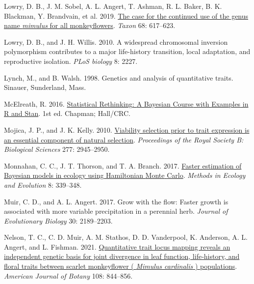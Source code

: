 \documentclass[
  12pt,
]{article}
\newlength{\cslhangindent}
\newlength{\cslentryspacingunit} %
\newenvironment{CSLReferences}[2] %
 {%
  \setlength{\parindent}{0pt}
  \ifodd #1
  \let\oldpar\par
  \def\par{\hangindent=\cslhangindent\oldpar}
  \fi
  \setlength{\parskip}{#2\cslentryspacingunit}
 }%
 {}
\begin{document}
\begin{CSLReferences}{1}{0}
\leavevmode{}%
Lowry, D. B., J. M. Sobel, A. L. Angert, T. Ashman, R. L. Baker, B. K. Blackman, Y. Brandvain, et al. 2019. \href{https://doi.org/10.1002/tax.12122}{The case for the continued use of the genus name \emph{mimulus} for all monkeyflowers}. \emph{Taxon} 68: 617--623.

\leavevmode{}%
Lowry, D. B., and J. H. Willis. 2010. A widespread chromosomal inversion polymorphism contributes to a major life-history transition, local adaptation, and reproductive isolation. \emph{PLoS biology} 8: 2227.

\leavevmode{}%
Lynch, M., and B. Walsh. 1998. Genetics and analysis of quantitative traits. Sinauer, Sunderland, Mass.

\leavevmode{}%
McElreath, R. 2016. \href{https://doi.org/10.1201/9781315372495}{Statistical {Rethinking}: {A} {Bayesian} {Course} with {Examples} in {R} and {Stan}}. 1st ed. Chapman; Hall/CRC.

\leavevmode{}%
Mojica, J. P., and J. K. Kelly. 2010. \href{https://doi.org/10.1098/rspb.2010.0568}{Viability selection prior to trait expression is an essential component of natural selection}. \emph{Proceedings of the Royal Society B: Biological Sciences} 277: 2945--2950.

\leavevmode{}%
Monnahan, C. C., J. T. Thorson, and T. A. Branch. 2017. \href{https://doi.org/10.1111/2041-210X.12681}{Faster estimation of {Bayesian} models in ecology using {Hamiltonian} {Monte} {Carlo}}. \emph{Methods in Ecology and Evolution} 8: 339--348.

\leavevmode{}%
Muir, C. D., and A. L. Angert. 2017. Grow with the flow: Faster growth is associated with more variable precipitation in a perennial herb. \emph{Journal of Evolutionary Biology} 30: 2189--2203.

\leavevmode{}%
Nelson, T. C., C. D. Muir, A. M. Stathos, D. D. Vanderpool, K. Anderson, A. L. Angert, and L. Fishman. 2021. \href{https://doi.org/10.1002/ajb2.1660}{Quantitative trait locus mapping reveals an independent genetic basis for joint divergence in leaf function, life‐history, and floral traits between scarlet monkeyflower ( \emph{{Mimulus} cardinalis} ) populations}. \emph{American Journal of Botany} 108: 844--856.


\end{CSLReferences}
\end{document}
